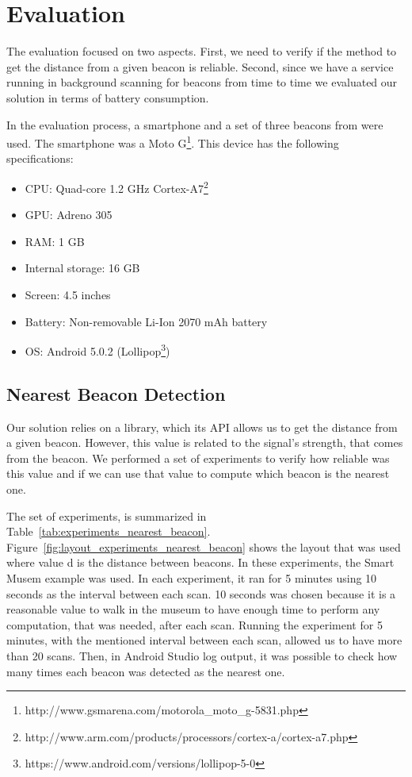 
\section{Evaluation}
\label{sec:evaluation}
The evaluation focused on two aspects.
First, we need to verify if the method to get the distance from a given beacon is reliable.
Second, since we have a service running in background scanning for beacons from time to time we evaluated our solution in terms of battery consumption.

In the evaluation process, a smartphone and a set of three beacons from  were used.
The smartphone was a 
Moto G\footnote{http://www.gsmarena.com/motorola\_moto\_g-5831.php}.
This device has the following specifications:
\begin{itemize}
  \item \gls{CPU}: Quad-core 1.2 GHz Cortex-A7\footnote{http://www.arm.com/products/processors/cortex-a/cortex-a7.php}
  \item \gls{GPU}: Adreno 305
  \item \gls{RAM}: 1 \gls{GB}
  \item Internal storage: 16 \gls{GB}
  \item Screen: 4.5 inches
  \item Battery: Non-removable Li-Ion 2070 \gls{mAh} battery
  \item \gls{OS}: Android 5.0.2 (Lollipop\footnote{https://www.android.com/versions/lollipop-5-0})
\end{itemize}

\subsection{Nearest Beacon Detection}
\label{sec:evaluation_nearest_beacon}
Our solution relies on a library, which its \gls{API} allows us to get the distance from a given beacon.
However, this value is related to the signal's strength, that comes from the beacon.
We performed a set of experiments to verify how reliable was this value and if we can use that value to compute which beacon is the nearest one.

The set of experiments, is summarized in Table~\ref{tab:experiments_nearest_beacon}.
Figure~\ref{fig:layout_experiments_nearest_beacon} shows the layout that was used where value d is the distance between beacons.
In these experiments, the Smart Musem example was used.
In each experiment, it ran for 5 minutes using 10 seconds as the interval between each scan.
10 seconds was chosen because it is a reasonable value to walk in the museum to have enough time to perform any computation, that was needed, after each scan.
Running the experiment for 5 minutes, with the mentioned interval between each scan, allowed us to have more than 20 scans.
Then, in Android Studio log output, it was possible to check how many times each beacon was detected as the nearest one.

